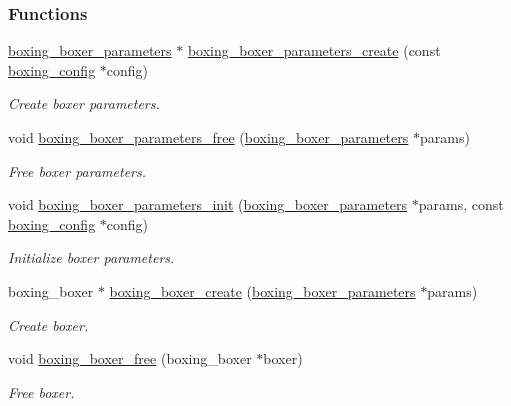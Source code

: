\subsubsection*{Functions}
\begin{DoxyCompactItemize}
\item 
\hyperlink{structboxing__boxer__parameters__s}{boxing\_\-boxer\_\-parameters} $\ast$ \hyperlink{group__boxer_ga7ff3d63a4b306374a16ad7a435d3aa52}{boxing\_\-boxer\_\-parameters\_\-create} (const \hyperlink{structboxing__config__s}{boxing\_\-config} $\ast$config)
\begin{DoxyCompactList}\small\item\em Create boxer parameters. \item\end{DoxyCompactList}\item 
void \hyperlink{group__boxer_gac254af5ce8ee6a05f39869c70bad33e8}{boxing\_\-boxer\_\-parameters\_\-free} (\hyperlink{structboxing__boxer__parameters__s}{boxing\_\-boxer\_\-parameters} $\ast$params)
\begin{DoxyCompactList}\small\item\em Free boxer parameters. \item\end{DoxyCompactList}\item 
void \hyperlink{group__boxer_ga28975734772cdb389c97d7adf3e9f156}{boxing\_\-boxer\_\-parameters\_\-init} (\hyperlink{structboxing__boxer__parameters__s}{boxing\_\-boxer\_\-parameters} $\ast$params, const \hyperlink{structboxing__config__s}{boxing\_\-config} $\ast$config)
\begin{DoxyCompactList}\small\item\em Initialize boxer parameters. \item\end{DoxyCompactList}\item 
boxing\_\-boxer $\ast$ \hyperlink{group__boxer_ga185a034b3140ffa2f27552b45e122783}{boxing\_\-boxer\_\-create} (\hyperlink{structboxing__boxer__parameters__s}{boxing\_\-boxer\_\-parameters} $\ast$params)
\begin{DoxyCompactList}\small\item\em Create boxer. \item\end{DoxyCompactList}\item 
void \hyperlink{group__boxer_gafbafe20dd1e70dd09896e80e9c76332d}{boxing\_\-boxer\_\-free} (boxing\_\-boxer $\ast$boxer)
\begin{DoxyCompactList}\small\item\em Free boxer. \item\end{DoxyCompactList}\end{DoxyCompactItemize}


